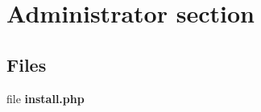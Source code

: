 \section{Administrator section}
\label{group__OTK__ADMIN}
\subsection*{Files}
\begin{DoxyCompactItemize}
\item 
file {\bf install.php}
\end{DoxyCompactItemize}
